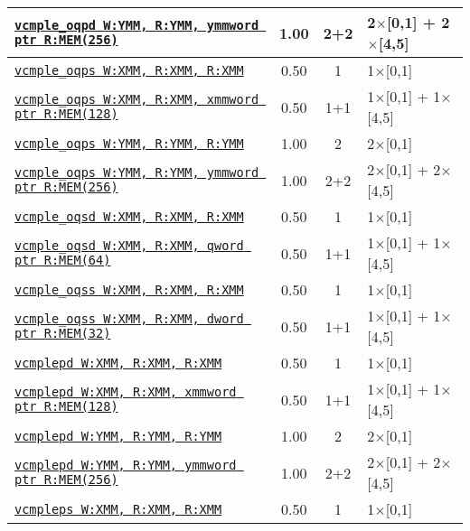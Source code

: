 \documentclass[a4paper,english,fontsize=9]{scrartcl}
\begin{document}
\begin{longtable}{p{}ccL{.25\textwidth}}
  \midrule
  \texttt{\href{https://felixcloutier.com/x86/CMPPD.html}{vcmple\_oqpd W:YMM, R:YMM, ymmword ptr R:MEM(256)}} & 1.00 & 2+2 & 2\(\times\)[0,1] + 2\(\times\)[4,5] \\
  \midrule
  \texttt{\href{https://felixcloutier.com/x86/CMPPS.html}{vcmple\_oqps W:XMM, R:XMM, R:XMM}} & 0.50 & 1 & 1\(\times\)[0,1] \\
  \midrule
  \texttt{\href{https://felixcloutier.com/x86/CMPPS.html}{vcmple\_oqps W:XMM, R:XMM, xmmword ptr R:MEM(128)}} & 0.50 & 1+1 & 1\(\times\)[0,1] + 1\(\times\)[4,5] \\
  \midrule
  \texttt{\href{https://felixcloutier.com/x86/CMPPS.html}{vcmple\_oqps W:YMM, R:YMM, R:YMM}} & 1.00 & 2 & 2\(\times\)[0,1] \\
  \midrule
  \texttt{\href{https://felixcloutier.com/x86/CMPPS.html}{vcmple\_oqps W:YMM, R:YMM, ymmword ptr R:MEM(256)}} & 1.00 & 2+2 & 2\(\times\)[0,1] + 2\(\times\)[4,5] \\
  \midrule
  \texttt{\href{https://felixcloutier.com/x86/CMPSD.html}{vcmple\_oqsd W:XMM, R:XMM, R:XMM}} & 0.50 & 1 & 1\(\times\)[0,1] \\
  \midrule
  \texttt{\href{https://felixcloutier.com/x86/CMPSD.html}{vcmple\_oqsd W:XMM, R:XMM, qword ptr R:MEM(64)}} & 0.50 & 1+1 & 1\(\times\)[0,1] + 1\(\times\)[4,5] \\
  \midrule
  \texttt{\href{https://felixcloutier.com/x86/CMPSS.html}{vcmple\_oqss W:XMM, R:XMM, R:XMM}} & 0.50 & 1 & 1\(\times\)[0,1] \\
  \midrule
  \texttt{\href{https://felixcloutier.com/x86/CMPSS.html}{vcmple\_oqss W:XMM, R:XMM, dword ptr R:MEM(32)}} & 0.50 & 1+1 & 1\(\times\)[0,1] + 1\(\times\)[4,5] \\
  \midrule
  \texttt{\href{https://felixcloutier.com/x86/CMPPD.html}{vcmplepd W:XMM, R:XMM, R:XMM}} & 0.50 & 1 & 1\(\times\)[0,1] \\
  \midrule
  \texttt{\href{https://felixcloutier.com/x86/CMPPD.html}{vcmplepd W:XMM, R:XMM, xmmword ptr R:MEM(128)}} & 0.50 & 1+1 & 1\(\times\)[0,1] + 1\(\times\)[4,5] \\
  \midrule
  \texttt{\href{https://felixcloutier.com/x86/CMPPD.html}{vcmplepd W:YMM, R:YMM, R:YMM}} & 1.00 & 2 & 2\(\times\)[0,1] \\
  \midrule
  \texttt{\href{https://felixcloutier.com/x86/CMPPD.html}{vcmplepd W:YMM, R:YMM, ymmword ptr R:MEM(256)}} & 1.00 & 2+2 & 2\(\times\)[0,1] + 2\(\times\)[4,5] \\
  \midrule
  \texttt{\href{https://felixcloutier.com/x86/CMPPS.html}{vcmpleps W:XMM, R:XMM, R:XMM}} & 0.50 & 1 & 1\(\times\)[0,1] \\

\end{longtable}
\end{document}
